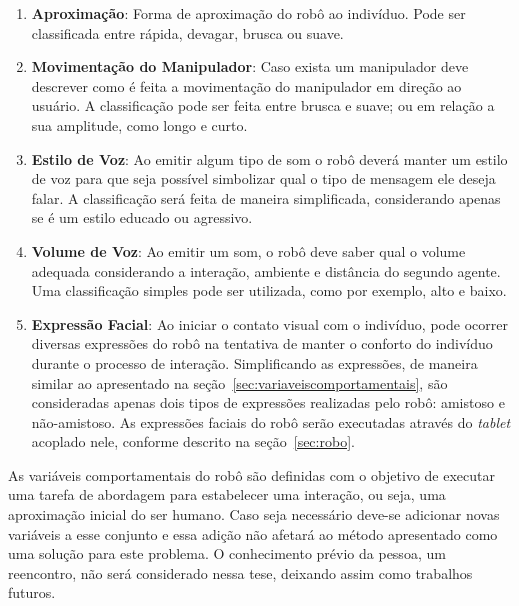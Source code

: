 \begin{enumerate}
	\item \textbf{Aproximação}: Forma de aproximação do robô ao indivíduo. Pode ser classificada entre rápida, devagar, brusca ou suave.
	\item \textbf{Movimentação do Manipulador}: Caso exista um manipulador deve descrever como é feita a movimentação do manipulador em direção ao usuário. A classificação pode ser feita entre brusca e suave; ou em relação a sua amplitude, como longo e curto.
	\item \textbf{Estilo de Voz}: Ao emitir algum tipo de som o robô deverá manter um estilo de voz para que seja possível simbolizar qual o tipo de mensagem ele deseja falar. A classificação será feita de maneira simplificada, considerando apenas se é um estilo educado ou agressivo.
	\item \textbf{Volume de Voz}: Ao emitir um som, o robô deve saber qual o volume adequada considerando a interação, ambiente e distância do segundo agente. Uma classificação simples pode ser utilizada, como por exemplo, alto e baixo.
	\item \textbf{Expressão Facial}: Ao iniciar o contato visual com o indivíduo, pode ocorrer diversas expressões do robô na tentativa de manter o conforto do indivíduo durante o processo de interação. Simplificando as expressões, de maneira similar ao apresentado na seção~\ref{sec:variaveiscomportamentais}, são consideradas apenas dois tipos de expressões realizadas pelo robô: amistoso e não-amistoso. As expressões faciais do robô serão executadas através do \emph{tablet} acoplado nele, conforme descrito na seção~\ref{sec:robo}.
\end{enumerate}

As variáveis comportamentais do robô são definidas com o objetivo de executar uma tarefa de abordagem para estabelecer uma interação, ou seja, uma aproximação inicial do ser humano. Caso seja necessário deve-se adicionar novas variáveis a esse conjunto e essa adição não afetará ao método apresentado como uma solução para este problema. O conhecimento prévio da pessoa, um reencontro, não será considerado nessa tese, deixando assim como trabalhos futuros.
